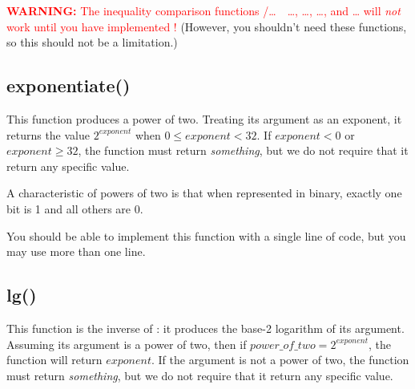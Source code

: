 \textcolor{red}{\textbf{WARNING:} The inequality comparison functions /\dots\ \ \dots{}, \dots{}, \dots{}, and \dots{} will \textit{not} work until you have implemented !}
(However, you shouldn't need these functions, so this should not be a limitation.)

\begin{description}
\end{description}


\subsection{exponentiate()}

This function produces a power of two.
Treating its argument as an exponent, it returns the value $2^{exponent}$ when $0 \le exponent < 32$.
If $exponent < 0$ or $exponent \ge 32$, the function must return \textit{something}, but we do not require that it return any specific value.

A characteristic of powers of two is that when represented in binary, exactly one bit is 1 and all others are 0.

\begin{description}
\end{description}
You should be able to implement this function with a single line of code,
but you may use more than one line.


\subsection{lg()}

This function is the inverse of :
it produces the base-2 logarithm of its argument.
Assuming its argument is a power of two, then if $power\_of\_two = 2^{exponent}$, the function will return $exponent$.
If the argument is not a power of two, the function must return \textit{something}, but we do not require that it return any specific value.


